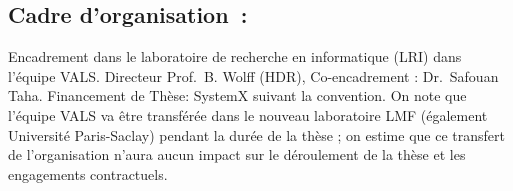 \documentclass[a4paper,10pt]{article}
\begin{document}
\subsection*{Cadre d'organisation~:}
Encadrement dans le laboratoire de recherche en informatique (LRI)
dans l'équipe VALS\@.
Directeur Prof.\ B. Wolff (HDR), Co-encadrement : Dr.\ Safouan Taha.
Financement de Thèse: SystemX suivant la convention.
On note que l'équipe VALS va être transférée
dans le nouveau laboratoire LMF (également Université Paris-Saclay)
pendant la durée de la thèse ;
on estime que ce transfert de l'organisation n'aura aucun impact
sur le déroulement de la thèse et les engagements contractuels.



\end{document}
